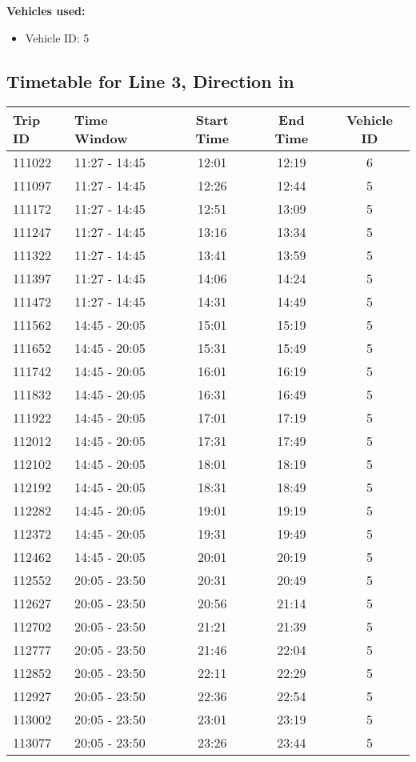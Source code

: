 \documentclass{article}
\begin{document}
\textbf{Vehicles used:}
\begin{itemize}
  \item Vehicle ID: 5
\end{itemize}

\subsection*{Timetable for Line 3, Direction in}
\begin{tabular}{llccc}
\toprule
Trip ID & Time Window & Start Time & End Time & Vehicle ID \\
\midrule
111022 & 11:27 - 14:45 & 12:01 & 12:19 & 6 \\
111097 & 11:27 - 14:45 & 12:26 & 12:44 & 5 \\
111172 & 11:27 - 14:45 & 12:51 & 13:09 & 5 \\
111247 & 11:27 - 14:45 & 13:16 & 13:34 & 5 \\
111322 & 11:27 - 14:45 & 13:41 & 13:59 & 5 \\
111397 & 11:27 - 14:45 & 14:06 & 14:24 & 5 \\
111472 & 11:27 - 14:45 & 14:31 & 14:49 & 5 \\
111562 & 14:45 - 20:05 & 15:01 & 15:19 & 5 \\
111652 & 14:45 - 20:05 & 15:31 & 15:49 & 5 \\
111742 & 14:45 - 20:05 & 16:01 & 16:19 & 5 \\
111832 & 14:45 - 20:05 & 16:31 & 16:49 & 5 \\
111922 & 14:45 - 20:05 & 17:01 & 17:19 & 5 \\
112012 & 14:45 - 20:05 & 17:31 & 17:49 & 5 \\
112102 & 14:45 - 20:05 & 18:01 & 18:19 & 5 \\
112192 & 14:45 - 20:05 & 18:31 & 18:49 & 5 \\
112282 & 14:45 - 20:05 & 19:01 & 19:19 & 5 \\
112372 & 14:45 - 20:05 & 19:31 & 19:49 & 5 \\
112462 & 14:45 - 20:05 & 20:01 & 20:19 & 5 \\
112552 & 20:05 - 23:50 & 20:31 & 20:49 & 5 \\
112627 & 20:05 - 23:50 & 20:56 & 21:14 & 5 \\
112702 & 20:05 - 23:50 & 21:21 & 21:39 & 5 \\
112777 & 20:05 - 23:50 & 21:46 & 22:04 & 5 \\
112852 & 20:05 - 23:50 & 22:11 & 22:29 & 5 \\
112927 & 20:05 - 23:50 & 22:36 & 22:54 & 5 \\
113002 & 20:05 - 23:50 & 23:01 & 23:19 & 5 \\
113077 & 20:05 - 23:50 & 23:26 & 23:44 & 5 \\
\bottomrule
\end{tabular}
\end{document}
